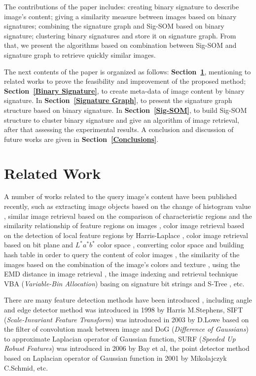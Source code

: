 \documentclass{amcs}
\begin{document}
The contributions of the paper includes: creating binary signature to describe image's content; giving a similarity measure between images based on binary signatures; combining the signature graph and Sig-SOM based on binary signature; clustering binary signatures and store it on signature graph. From that, we present the algorithms based on combination between Sig-SOM and signature graph to retrieve quickly similar images.

The next contents of the paper is organized as follows: \textbf{Section~\ref{Related Work}}, mentioning to related works to prove the feasibility and improvement of the proposed method; \textbf{Section~\ref{Binary Signature}}, to create meta-data of image content by binary signature. In \textbf{Section~\ref{Signature Graph}}, to present the signature graph structure based on binary signature. In \textbf{Section~\ref{Sig-SOM}}, to build Sig-SOM structure to cluster binary signature and give an algorithm of image retrieval, after that assessing the experimental results. A conclusion and discussion of future works are given in \textbf{Section~\ref{Conclusions}}.




\section{Related Work}
\label{Related Work}
A number of works related to the query image's content have been published recently, such as extracting image objects based on the change of histogram value \cite{Liu:13}, similar image retrieval based on the comparison of characteristic regions and the similarity relationship of feature regions on images \cite{Bartolini:10}, color image retrieval based on the detection of local feature regions by Harris-Laplace \cite{Wang:10}, color image retrieval based on bit plane and $L^*a^*b^*$ color space \cite{Wang:13}, converting color space and building hash table in order to query the content of color images \cite{Tang:13}, the similarity of the images based on the combination of the image's colors and texture \cite{Singha:12}, using the EMD distance in image retrieval \cite{Bahri:11}, the image indexing and retrieval technique VBA (\textit{Variable-Bin Allocation}) basing on signature bit strings and S-Tree \cite{Yannis:02}, etc.

There are many feature detection methods have been introduced \cite{Wang:13}, including angle and edge detector method was introduced in 1998 by Harris  M.Stephens, SIFT (\textit{Scale-Invariant Feature Transform}) was introduced in 2003 by D.Lowe based on the filter of convolution mask between image and DoG (\textit{Difference of Gaussians}) to approximate Laplacian operator of Gaussian function, SURF (\textit{Speeded Up Robust Features}) was introduced in 2006 by Bay et al, the point detector method based on Laplacian operator of Gaussian function in 2001 by Mikolajczyk  C.Schmid, etc.
\end{document}
